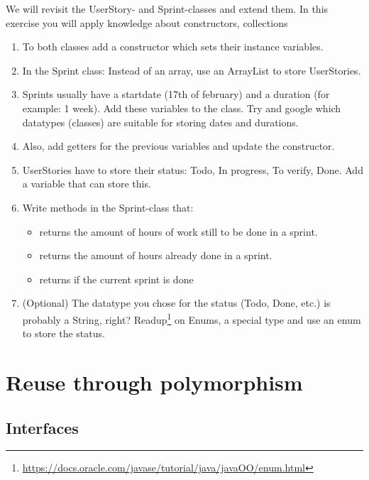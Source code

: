                  We will revisit the UserStory- and Sprint-classes and extend them. In this exercise you will apply knowledge about constructors, collections
                     \begin{enumerate}
                         \item To both classes add a constructor which sets their instance variables.
                         \item In the Sprint class: Instead of an array, use an ArrayList to store UserStories.
                         \item Sprints usually have a startdate (17th of february) and a duration (for example: 1 week). Add these variables to the class. Try and google which datatypes (classes) are suitable for storing dates and durations.
                         \item Also, add getters for the previous variables and update the constructor.
                         \item UserStories have to store their status: Todo, In progress, To verify, Done. Add a variable that can store this.
                         \item Write methods in the Sprint-class that:
                         \begin{itemize}
                              \item returns the amount of hours of work still to be done in a sprint.
                              \item returns the amount of hours already done in a sprint.
                              \item returns if the current sprint is done
                         \end{itemize}
                         \item (Optional) The datatype you chose for the status (Todo, Done, etc.) is probably a String, right? Readup\footnote{\href{https://docs.oracle.com/javase/tutorial/java/javaOO/enum.html}{https://docs.oracle.com/javase/tutorial/java/javaOO/enum.html}} on Enums, a special type and use an enum to store the status.
                     \end{enumerate}


\chapter{Reuse through polymorphism}

    \section{Interfaces}	    
